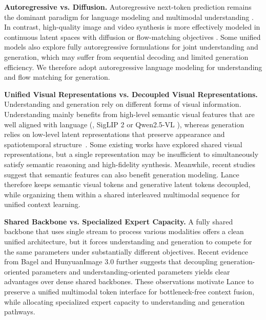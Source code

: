\textbf{Autoregressive vs. Diffusion.}
Autoregressive next-token prediction remains the dominant paradigm for language modeling \cite{touvron2023llama,achiam2023gpt,liu2024deepseek} and multimodal understanding \cite{Qwen3-VL,xu2024pllava,li2025videochat}. %
In contrast, high-quality image and video synthesis is more effectively modeled in continuous latent spaces with diffusion or flow-matching objectives \cite{ding2021cogview,li2023blip,cai2024diffusion_selfdistill,labs2025flux,wu2025qwen}. %
 Some unified models \cite{team2024chameleon,wu2024vila,wang2024emu3,qu2025tokenflow} also explore fully autoregressive formulations for joint understanding and generation, which may suffer from sequential decoding and limited generation efficiency. 
We therefore adopt autoregressive language modeling for understanding and flow matching for generation.





\textbf{Unified Visual Representations vs. Decoupled Visual Representations.}
Understanding and generation rely on different forms of visual information. Understanding mainly benefits from high-level semantic visual features that are well aligned with language (\eg, SigLIP 2 \cite{tschannen2025siglip} or Qwen2.5-VL \cite{Qwen2.5-VL}), whereas generation relies on low-level latent representations that preserve appearance and spatiotemporal structure~\cite{wan2025wan}. %
Some existing works \cite{liu2025tuna} have explored shared visual representations, but a single representation may be insufficient to simultaneously satisfy semantic reasoning and high-fidelity synthesis.
Meanwhile, recent studies~\cite{yu2024representation,zheng2025diffusion} suggest that semantic features can also benefit generation modeling. Lance therefore keeps semantic visual tokens and generative latent tokens decoupled, while organizing them within a shared interleaved multimodal sequence for unified context learning.

\textbf{Shared Backbone vs. Specialized Expert Capacity.}
A fully shared backbone that uses single stream to process various modalities \cite{huang2022dse,xie2025show,liu2025tuna} offers a clean unified architecture, but it forces understanding and generation to compete for the same parameters under substantially different objectives. Recent evidence from Bagel \cite{deng2025emerging} and HunyuanImage 3.0 \cite{cao2025hunyuanimage} further suggests that decoupling generation-oriented parameters and understanding-oriented parameters yields clear advantages over dense shared backbones.
These observations motivate Lance to preserve a unified multimodal token interface for bottleneck-free context fusion, while allocating specialized expert capacity to understanding and generation pathways.



